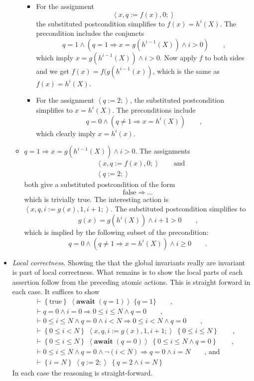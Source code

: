 \documentclass[11pt]{article}%
\begin{document}
\begin{itemize}
\begin{itemize}
\begin{itemize}
\item For the assignment%
\[
\left\langle x,q:=f(x),0;\right\rangle
\]
the substituted postcondition simplifies to $f(x)=h^{i}(X)$. The precondition
includes the conjuncts%
\[
q=1\wedge\left(  q=1\Rightarrow x=g(h^{i-1}(X))\wedge i>0\right)
\qquad\text{,}%
\]
which imply $x=g(h^{i-1}(X))\wedge i>0$. Now apply $f$ to both sides and we
get $f(x)=f(g(h^{i-1}(x))$, which is the same as $f(x)=h^{i}(X)$.

\item For the assignment $\left\langle q:=2;\right\rangle $, the substituted
postcondition simplifies to $x=h^{i}(X)$. The preconditions include%
\[
q=0\wedge\left(  q\neq1\Rightarrow x=h^{i}(X)\right)  \qquad\text{,}%
\]
which clearly imply $x=h^{i}(x)$.
\end{itemize}

\item $q=1\Rightarrow x=g(h^{i-1}(X))\wedge i>0$. The assignments
\begin{align*}
&  \left\langle x,q:=f(x),0;\right\rangle \qquad\text{and}\\
&  \left\langle q:=2;\right\rangle
\end{align*}
both give a substituted postcondition of the form%
\[
\mathrm{false}\Rightarrow...
\]
which is trivially true. The interesting action is $\left\langle
x,q,i:=g(x),1,i+1;\right\rangle $. The substituted postcondition simplifies
to
\[
g(x)=g(h^{i}(X))\wedge i+1>0\qquad\text{,}%
\]
which is implied by the following subset of the precondition:%
\[
q=0\wedge\left(  q\neq1\Rightarrow x=h^{i}(X)\right)  \wedge i\geq
0\qquad\text{.}%
\]

\end{itemize}

\item \emph{Local correctness.} Showing the that the global invariants really
are invariant is part of local correctness. What remains is to show the local
parts of each assertion follow from the preceding atomic actions. This is
straight forward in each case. It suffices to show%
\begin{align*}
&  \vdash\left\{  \mathrm{true}\right\}  \;\left\langle \mathbf{await}%
\;(q=1)\right\rangle \;\{q=1\}\qquad\text{,}\\
&  \vdash q=0\wedge i=0\Rightarrow0\leq i\leq N\wedge q=0\qquad\text{,}\\
&  \vdash0\leq i\leq N\wedge q=0\wedge i<N\Rightarrow0\leq i<N\wedge
q=0\qquad\text{,}\\
&  \vdash\left\{  0\leq i<N\right\}  \;\left\langle
x,q,i:=g(x),1,i+1;\right\rangle \;\left\{  0\leq i\leq N\right\}
\qquad\text{,}\\
&  \vdash\left\{  0\leq i\leq N\right\}  \;\left\langle \mathbf{await\;}%
(q=0)\right\rangle \;\left\{  0\leq i\leq N\wedge q=0\right\}  \qquad
\text{,}\\
&  \vdash0\leq i\leq N\wedge q=0\wedge\lnot\left(  i<N\right)  \Rightarrow
q=0\wedge i=N\qquad\text{, and}\\
&  \vdash\left\{  i=N\right\}  \;\left\langle q:=2;\right\rangle \;\left\{
q=2\wedge i=N\right\}
\end{align*}
In each case the reasoning is straight-forward.


\end{itemize}
\end{document}
